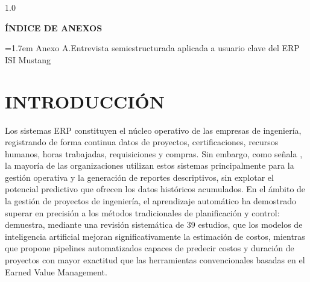 \documentclass{univalle-perfil}
\begin{document}
\makecaratula

\tableofcontents
\listoffigures
\listoftables

\newpage
\thispagestyle{sinpagina}
\begin{spacing}{1.0}
\setlength{\parskip}{2pt}
{\normalsize\bfseries ÍNDICE DE ANEXOS\par}
\vspace{\baselineskip}
\noindent\hangindent=1.7em Anexo A.\quad Entrevista semiestructurada aplicada a usuario clave del ERP ISI Mustang \dotfill \pageref{anexo:A}\par
\end{spacing}
\newpage


\section{INTRODUCCIÓN}

Los sistemas ERP constituyen el núcleo operativo de las empresas de ingeniería, registrando de forma continua datos de proyectos, certificaciones, recursos humanos, horas trabajadas, requisiciones y compras. Sin embargo, como señala \textcite{MLdrivenERP2023}, la mayoría de las organizaciones utilizan estos sistemas principalmente para la gestión operativa y la generación de reportes descriptivos, sin explotar el potencial predictivo que ofrecen los datos históricos acumulados. En el ámbito de la gestión de proyectos de ingeniería, el aprendizaje automático ha demostrado superar en precisión a los métodos tradicionales de planificación y control: \textcite{AIcostEstimation2024} demuestra, mediante una revisión sistemática de 39 estudios, que los modelos de inteligencia artificial mejoran significativamente la estimación de costos, mientras que \textcite{AutoMLpipeline2025} propone pipelines automatizados capaces de predecir costos y duración de proyectos con mayor exactitud que las herramientas convencionales basadas en el Earned Value Management.
\end{document}
